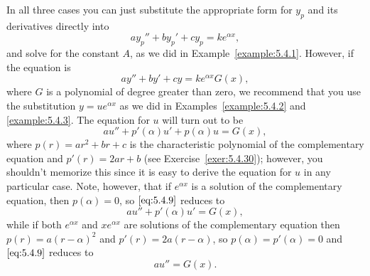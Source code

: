 \documentclass{ximera}
\begin{document}
 
In all three cases you can just substitute the appropriate form for
$y_p$ and its derivatives directly into
$$
ay_p''+by_p'+cy_p=ke^{\alpha x},
$$
and solve for the constant $A$, as we did in
Example~\ref{example:5.4.1}.
However, if the equation is
$$
ay''+by'+cy=k e^{\alpha x}G(x),
$$
where $G$ is a polynomial of degree greater than zero, we recommend
that you use the substitution $y=ue^{\alpha x}$ as we did in
Examples~\ref{example:5.4.2} and \ref{example:5.4.3}. The equation for $u$
will turn out to be
\begin{equation} \label{eq:5.4.9}
au''+p'(\alpha)u'+p(\alpha)u=G(x),
\end{equation}
where $p(r)=ar^2+br+c$ is the characteristic polynomial of the
complementary equation and $p'(r)=2ar+b$ (see Exercise~\ref{exer:5.4.30});
however, you shouldn't memorize this since it is easy to derive the equation for $u$ in any particular case. Note, however, that if $e^{\alpha x}$ is a solution of the complementary equation, then
$p(\alpha)=0$, so $\eqref{eq:5.4.9}$ reduces to
$$
au''+p'(\alpha)u'=G(x),
$$
while if both $e^{\alpha x}$ and $xe^{\alpha x}$ are solutions of the complementary equation then $p(r)=a(r-\alpha)^2$ and
$p'(r)=2a(r-\alpha)$, so $p(\alpha)=p'(\alpha)=0$ and $\eqref{eq:5.4.9}$
reduces to
$$
au''=G(x).
$$
 
\end{document}
